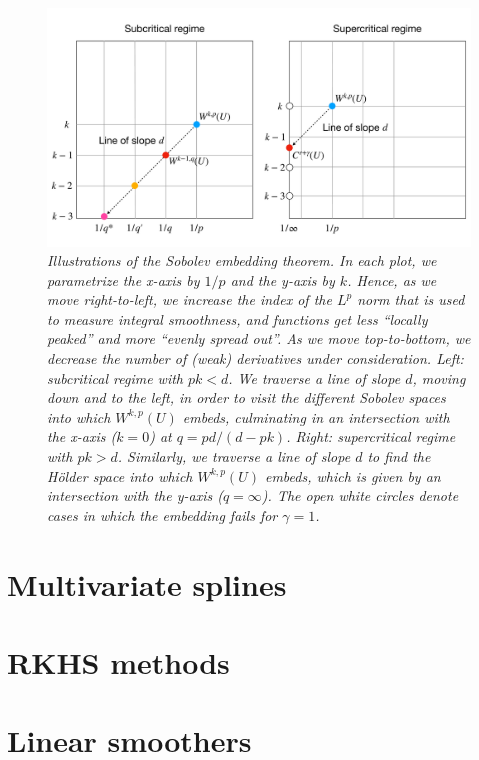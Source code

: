 \documentclass{article}
\begin{document}
\begin{figure}[tb]
\centering
\includegraphics[width=\textwidth]{sobolev.pdf}
\caption{\it Illustrations of the Sobolev embedding theorem. In each plot, we 
  parametrize the x-axis by $1/p$ and the y-axis by $k$. Hence, as we move
  right-to-left, we increase the index of the $L^p$ norm that is used to measure 
  integral smoothness, and functions get less ``locally peaked'' and more 
  ``evenly spread out''. As we move top-to-bottom, we decrease the number of
  (weak) derivatives under consideration. Left: subcritical regime with $pk <
  d$. We traverse a line of slope $d$, moving down and to the left, in order to
  visit the different Sobolev spaces into which $W^{k,p}(U)$ embeds, culminating
  in an intersection with the x-axis ($k=0$) at $q = pd/(d-pk)$. Right:
  supercritical regime with $pk > d$. Similarly, we traverse a line of slope $d$
  to find the H{\"o}lder space into which $W^{k,p}(U)$ embeds, which is given by
  an intersection with the y-axis ($q = \infty$). The open white circles denote
  cases in which the embedding fails for $\gamma = 1$.}  
\label{fig:sobolev}
\end{figure}

\section{Multivariate splines}

\section{RKHS methods}

\section{Linear smoothers}
\end{document}
